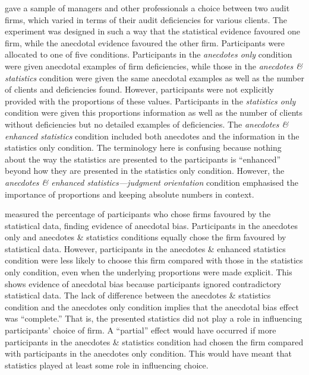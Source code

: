 \documentclass[a4paper, nobind]{templates/ociamthesis}
\theoremstyle{definition}
\theoremstyle{definition}
\theoremstyle{definition}
\theoremstyle{definition}
\theoremstyle{remark}
\begin{document}
\textcite{wainberg2013} gave a sample of managers and other professionals a choice between
two audit firms, which varied in terms of their audit deficiencies for various
clients. The experiment was designed in such a way that the statistical evidence
favoured one firm, while the anecdotal evidence favoured the other firm.
Participants were allocated to one of five conditions. Participants in the
\emph{anecdotes only} condition were given anecdotal examples of firm deficiencies,
while those in the \emph{anecdotes \& statistics} condition were given the same
anecdotal examples as well as the number of clients and deficiencies found.
However, participants were not explicitly provided with the proportions of these
values. Participants in the \emph{statistics only} condition were given this
proportions information as well as the number of clients without deficiencies
but no detailed examples of deficiencies. The \emph{anecdotes \& enhanced statistics}
condition included both anecdotes and the information in the statistics only
condition. The terminology here is confusing because nothing about the way the
statistics are presented to the participants is ``enhanced'' beyond how they are
presented in the statistics only condition. However, the \emph{anecdotes \& enhanced
statistics---judgment orientation} condition emphasised the importance of
proportions and keeping absolute numbers in context.

\textcite{wainberg2013} measured the percentage of participants who chose firms favoured
by the statistical data, finding evidence of anecdotal bias. Participants in the
anecdotes only and anecdotes \& statistics conditions equally chose the firm
favoured by statistical data. However, participants in the anecdotes \& enhanced
statistics condition were less likely to choose this firm compared with those in
the statistics only condition, even when the underlying proportions were made
explicit. This shows evidence of anecdotal bias because participants ignored
contradictory statistical data. The lack of difference between the anecdotes \&
statistics condition and the anecdotes only condition implies that the anecdotal
bias effect was ``complete.'' That is, the presented statistics did not play a
role in influencing participants' choice of firm. A ``partial'' effect would have
occurred if more participants in the anecdotes \& statistics condition had chosen
the firm compared with participants in the anecdotes only condition. This would
have meant that statistics played at least some role in influencing choice.
\end{document}
